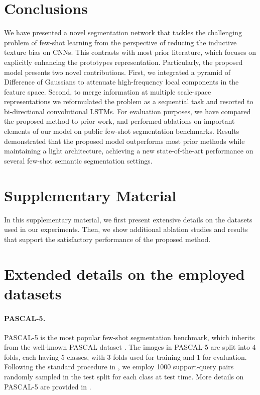 \documentclass[runningheads]{llncs}
\begin{document}
\section{Conclusions}

We have presented a novel segmentation network that tackles the challenging problem of few-shot learning from the perspective of reducing the inductive texture bias on CNNs. This contrasts with most prior literature, which focuses on explicitly enhancing the prototypes representation. Particularly, the proposed model presents two novel contributions. First, we integrated a pyramid of Difference of Gaussians to attenuate high-frequency local components in the feature space. Second, to merge information at multiple scale-space representations we reformulated the problem as a sequential task and resorted to bi-directional convolutional LSTMs. 
For evaluation purposes, we have compared the proposed method to prior work, and performed ablations on important elements of our model on public few-shot segmentation benchmarks. Results demonstrated that the proposed model outperforms most prior methods while maintaining a light architecture, achieving a new state-of-the-art performance on several few-shot semantic  segmentation settings.




\clearpage



\section*{Supplementary Material}

In this supplementary material, we first present extensive details on the datasets used in our experiments. Then, we show additional ablation studies and results that support the satisfactory performance of the proposed method.

\setcounter{section}{0}
\setcounter{table}{0}

\section{Extended details on the employed datasets}
\paragraph{\textbf{PASCAL-5}.} PASCAL-5 \cite{shaban2017one} is the most popular few-shot segmentation benchmark, which inherits from the well-known PASCAL dataset \cite{everingham2010pascal}. The images in PASCAL-5 are split into 4 folds, each having 5 classes, with 3 folds used for training and 1 for evaluation. Following the standard procedure in  \cite{shaban2017one,nguyen2019feature}, we employ 1000 support-query pairs randomly sampled in the test split for each class at test time. More details on PASCAL-5 are provided in \cite{shaban2017one}. 
\end{document}
